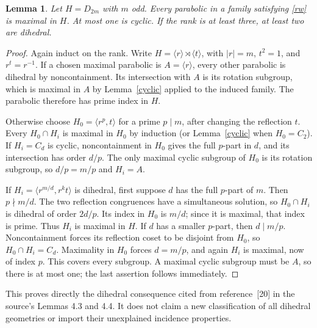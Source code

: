 \documentclass[11pt,a4paper]{article}
\newtheorem{lemma}{Lemma}
\newcommand{\gen}[1]{\langle#1\rangle}
\begin{document}
\begin{lemma}\label{dihedral}
Let $H=D_{2m}$ with $m$ odd. Every parabolic in a family satisfying
\eqref{rw} is maximal in $H$. At most one is cyclic. If the rank is
at least three, at least two are dihedral.
\end{lemma}
\begin{proof}
Again induct on the rank. Write $H=\gen r\rtimes\gen t$, with
$|r|=m$, $t^2=1$, and $r^t=r^{-1}$. If a chosen maximal parabolic
is $A=\gen r$, every other parabolic is dihedral by noncontainment.
Its intersection with $A$ is its rotation subgroup, which is maximal
in $A$ by Lemma~\ref{cyclic} applied to the induced family. The
parabolic therefore has prime index in $H$.

Otherwise choose $H_0=\gen{r^p,t}$ for a prime $p\mid m$, after
changing the reflection $t$. Every $H_0\cap H_i$ is maximal in
$H_0$ by induction (or Lemma~\ref{cyclic} when $H_0=C_2$).
If $H_i=C_d$ is cyclic, noncontainment in $H_0$ gives the full
$p$-part in $d$, and its intersection has order $d/p$.
The only maximal cyclic subgroup of $H_0$ is its rotation subgroup,
so $d/p=m/p$ and $H_i=A$.

If $H_i=\gen{r^{m/d},r^k t}$ is dihedral, first suppose $d$
has the full $p$-part of $m$. Then $p\nmid m/d$. The two reflection
congruences have a simultaneous solution, so $H_0\cap H_i$ is
dihedral of order $2d/p$. Its index in $H_0$ is $m/d$; since it is
maximal, that index is prime. Thus $H_i$ is maximal in $H$.
If $d$ has a smaller $p$-part, then $d\mid m/p$. Noncontainment
forces its reflection coset to be disjoint from $H_0$, so
$H_0\cap H_i=C_d$. Maximality in $H_0$ forces $d=m/p$, and
again $H_i$ is maximal, now of index $p$.
This covers every subgroup. A maximal cyclic subgroup must be $A$,
so there is at most one; the last assertion follows immediately.
\end{proof}

This proves directly the dihedral consequence cited from reference~[20]
in the source's Lemmas 4.3 and 4.4. It does not claim a new classification
of all dihedral geometries or import their unexplained incidence properties.
\end{document}
